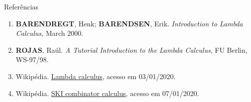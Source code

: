 \begin{frame}[fragile]{Referências}

    \begin{enumerate}
        \item \textbf{BARENDREGT}, Henk; \textbf{BARENDSEN}, Erik. \textit{Introduction to 
            Lambda Calculus}, March 2000.

        \item \textbf{ROJAS}, Raúl. \textit{A Tutorial Introduction to the Lambda Calculus},
            FU Berlin, WS-97/98.

        \item Wikipédia. \href{https://en.wikipedia.org/wiki/Lambda_calculus}{Lambda calculus},
            acesso em 03/01/2020. 

        \item Wikipédia. \href{https://en.wikipedia.org/wiki/SKI_combinator_calculus}{SKI
            combinator calculus}, acesso em 07/01/2020.
 
    \end{enumerate}

\end{frame}

